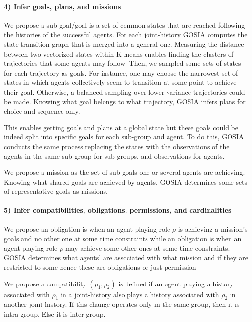 \documentclass[runningheads]{llncs}
\begin{document}
\paragraph{4) Infer goals, plans, and missions}

We propose a sub-goal/goal is a set of common states that are reached following the histories of the successful agents.
For each joint-history GOSIA computes the state transition graph that is merged into a general one. Measuring the distance between two vectorized states within K-means enables finding the clusters of trajectories that some agents may follow. Then, we sampled some sets of states for each trajectory as goals. For instance, one may choose the narrowest set of states in which agents collectively seem to transition at some point to achieve their goal. Otherwise, a balanced sampling over lower variance trajectories could be made. Knowing what goal belongs to what trajectory, GOSIA infers plans for choice and sequence only.

This enables getting goals and plans at a global state but these goals could be indeed split into specific goals for each sub-group and agent. To do this, GOSIA conducts the same process replacing the states with the observations of the agents in the same sub-group for sub-groups, and observations for agents.

We propose a mission as the set of sub-goals one or several agents are achieving.
Knowing what shared goals are achieved by agents, GOSIA determines some sets of representative goals as missions.

\paragraph{5) Infer compatibilities, obligations, permissions, and cardinalities}

We propose an obligation is when an agent playing role $\rho$ is achieving a mission's goals and no other one at some time constraints while an obligation is when an agent playing role $\rho$ may achieve some other ones at some time constraints.
GOSIA determines what agents' are associated with what mission and if they are restricted to some hence these are obligations or just permission

We propose a compatibility $(\rho_1,\rho_2)$ is defined if an agent playing a history associated with $\rho_1$ in a joint-history also plays a history associated with $\rho_2$ in another joint-history. If this change operates only in the same group, then it is intra-group. Else it is inter-group.
\end{document}
